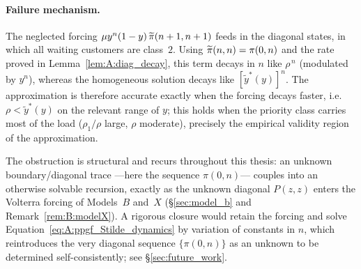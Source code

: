 \paragraph{Failure mechanism.}
The neglected forcing $\mu y^n(1-y)\,\widetilde{\pi}(n+1,n+1)$ feeds in the diagonal states, in which
all waiting customers are class~$2$. Using $\widetilde{\pi}(n,n)=\pi(0,n)$ and the rate proved
in Lemma~\ref{lem:A:diag_decay}, this term decays in $n$ like $\rho^{\,n}$ (modulated by
$y^n$), whereas the homogeneous solution decays like $[\widetilde{y}^*(y)]^n$. The
approximation is therefore accurate exactly when the forcing decays faster, i.e.\
$\rho<\widetilde{y}^*(y)$ on the relevant range of $y$; this holds when the priority
class carries most of the load ($\rho_1/\rho$ large, $\rho$ moderate), precisely the
empirical validity region of the approximation.

The obstruction is structural and recurs throughout this thesis: an unknown boundary/diagonal
trace ---here the sequence $\pi(0,n)$--- couples into an otherwise solvable recursion,
exactly as the unknown diagonal $P(z,z)$ enters the Volterra forcing of Models~$B$ and~$X$
(\S\ref{sec:model_b} and Remark~\ref{rem:B:modelX}). A rigorous closure would retain the forcing
and solve Equation~\eqref{eq:A:ppgf_Stilde_dynamics} by variation of constants in $n$, which
reintroduces the very diagonal sequence $\{\pi(0,n)\}$ as an unknown to be determined
self-consistently; see \S\ref{sec:future_work}.
